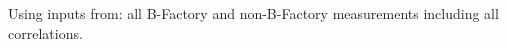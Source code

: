 \noindent Using inputs from: all B-Factory and non-B-Factory measurements including all correlations.
